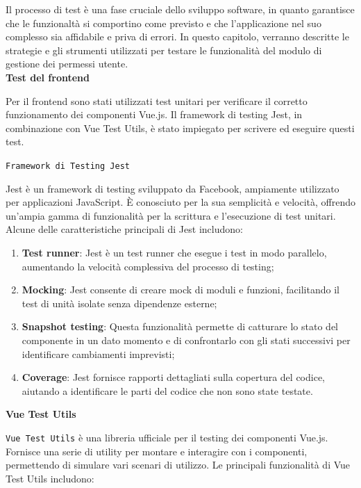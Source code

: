 \documentclass[a4paper, 12pt]{book}
\begin{document}
Il processo di test è una fase cruciale dello sviluppo software, in quanto garantisce che le funzionaltà si comportino
come previsto e che l'applicazione nel suo complesso sia affidabile e priva di errori. In questo capitolo, verranno descritte
le strategie e gli strumenti utilizzati per testare le funzionalità del modulo di gestione dei permessi utente.\\

\textbf{Test del frontend}

Per il frontend sono stati utilizzati test unitari per verificare il corretto funzionamento dei componenti Vue.js. Il framework di
testing Jest, in combinazione con Vue Test Utils, è stato impiegato per scrivere ed eseguire questi test.

\texttt{Framework di Testing Jest}

Jest è un framework di testing sviluppato da Facebook, ampiamente utilizzato per applicazioni JavaScript. È conosciuto per la
sua semplicità e velocità, offrendo un'ampia gamma di funzionalità per la scrittura e l'esecuzione di test unitari. Alcune delle
caratteristiche principali di Jest includono:

\begin{enumerate}
  \item \textbf{Test runner}: Jest è un test runner che esegue i test in modo parallelo, aumentando la velocità complessiva del processo di testing;
  \item \textbf{Mocking}: Jest consente di creare mock di moduli e funzioni, facilitando il test di unità isolate senza dipendenze esterne;
  \item \textbf{Snapshot testing}: Questa funzionalità permette di catturare lo stato del componente in un dato momento e di confrontarlo con
        gli stati successivi per identificare cambiamenti imprevisti;
  \item \textbf{Coverage}: Jest fornisce rapporti dettagliati sulla copertura del codice, aiutando a identificare le parti del codice che non sono state testate.
\end{enumerate}

\textbf{Vue Test Utils}

\texttt{Vue Test Utils} è una libreria ufficiale per il testing dei componenti Vue.js. Fornisce una serie di utility per montare e interagire
con i componenti, permettendo di simulare vari scenari di utilizzo. Le principali funzionalità di Vue Test Utils includono:
\end{document}
